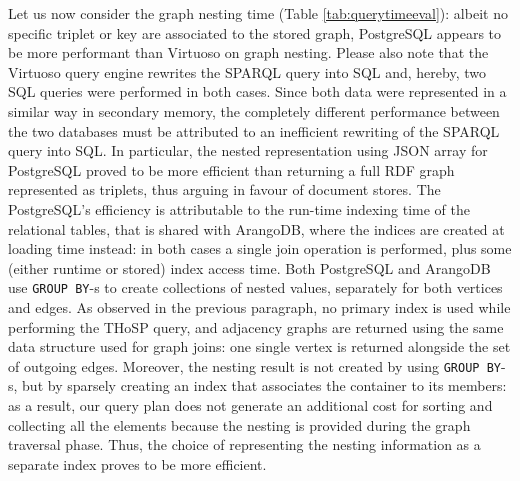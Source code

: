 Let us now consider the graph nesting time (Table \ref{tab:querytimeeval}): albeit no specific triplet or key are associated to the stored graph, PostgreSQL appears to be more performant than Virtuoso on graph nesting. Please also note that the Virtuoso query engine rewrites the SPARQL query into SQL and, hereby, two SQL queries were performed in both cases. Since both data were represented in a similar way in secondary memory, the completely different performance between the two databases must be attributed  to an inefficient rewriting of the SPARQL query into SQL. In particular, the nested representation using JSON array for PostgreSQL proved to be more efficient than returning a full RDF graph represented as triplets, thus arguing in favour of document stores. The PostgreSQL's efficiency is attributable to the run-time indexing time of the relational tables, that is shared with ArangoDB, where the indices are created at loading time instead: in both cases a single join operation is performed, plus some (either runtime or stored) index access time. Both PostgreSQL and ArangoDB use \texttt{GROUP BY}-s to create collections of nested values, separately for both vertices and edges. As observed in the previous paragraph, no primary index is used while performing the THoSP query, and adjacency graphs are returned using the same data structure used for graph joins: one single vertex is returned alongside the set of outgoing edges. Moreover, the nesting result is not created by using \texttt{GROUP BY}-s, but by sparsely creating an index that associates the container to its members: as a result, our query plan does not generate an additional cost for sorting and collecting all the elements because the nesting is provided during the graph traversal phase. Thus, the choice of representing the nesting information as a separate index proves to be more efficient.

